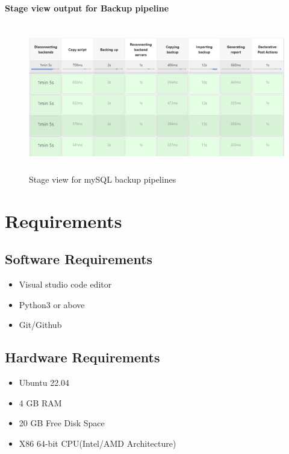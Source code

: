 \documentclass[12pt,a4paper,oneside]{report}
\begin{document}
\textbf{{\large Stage view output for Backup pipeline}}
\begin{figure}[H]
    \centering
    \includegraphics[width=150mm , height = 65mm]{backup-stages.png}
    \caption{Stage view for mySQL backup pipelines}
    \label{fig:figure5_1}
\end{figure}

\section{Requirements}
\subsection{Software Requirements}
\begin{itemize}
\item{Visual studio code editor}
\item{Python3 or above}
\item{Git/Github}
\end{itemize}

\subsection{Hardware Requirements}

\begin{itemize}
\item{Ubuntu 22.04}
\item{4 GB RAM}
\item{20 GB Free Disk Space}
\item{X86 64-bit CPU(Intel/AMD Architecture)}
\end{itemize}


\newpage
\end{document}
